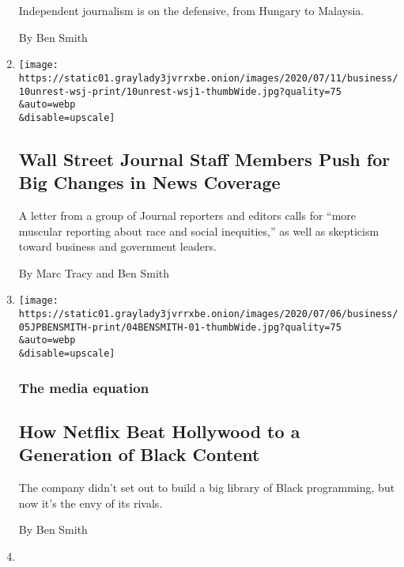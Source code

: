 \begin{enumerate}
  Independent journalism is on the defensive, from Hungary to Malaysia.

  By Ben Smith
\item
  \href{/2020/07/10/business/media/wall-street-journal-staff.html}{}

  \texttt{[image: https://static01.graylady3jvrrxbe.onion/images/2020/07/11/business/10unrest-wsj-print/10unrest-wsj1-thumbWide.jpg?quality=75\\\&auto=webp\\\&disable=upscale]}

  \hypertarget{wall-street-journal-staff-members-push-for-big-changes-in-news-coverage}{%
  \subsection{Wall Street Journal Staff Members Push for Big Changes in
  News
  Coverage}\label{wall-street-journal-staff-members-push-for-big-changes-in-news-coverage}}

  A letter from a group of Journal reporters and editors calls for
  ``more muscular reporting about race and social inequities,'' as well
  as skepticism toward business and government leaders.

  By Marc Tracy and Ben Smith
\item
  \href{/2020/07/05/business/media/netflix-hollywood-black-culture.html}{}

  \texttt{[image: https://static01.graylady3jvrrxbe.onion/images/2020/07/06/business/05JPBENSMITH-print/04BENSMITH-01-thumbWide.jpg?quality=75\\\&auto=webp\\\&disable=upscale]}

  \hypertarget{the-media-equation-4}{%
  \subsubsection{The media equation}\label{the-media-equation-4}}

  \hypertarget{how-netflix-beat-hollywood-to-a-generation-of-black-content}{%
  \subsection{How Netflix Beat Hollywood to a Generation of Black
  Content}\label{how-netflix-beat-hollywood-to-a-generation-of-black-content}}

  The company didn't set out to build a big library of Black
  programming, but now it's the envy of its rivals.

  By Ben Smith
\item
  \href{/2020/06/28/business/media/martin-baron-washington-post.html}{}


\end{enumerate}
